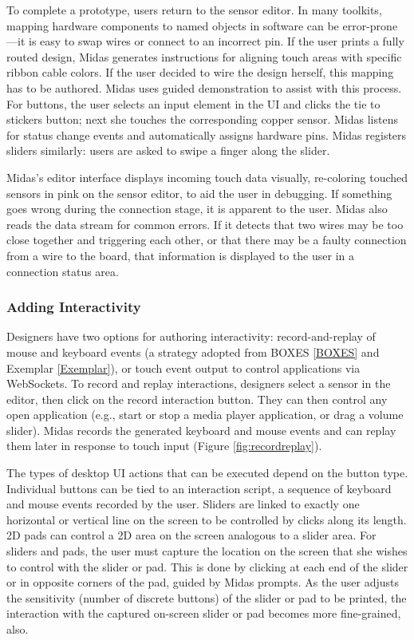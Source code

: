 To complete a prototype, users return to the sensor editor. In
many toolkits, mapping hardware components to named objects
in software can be error-prone—it is easy to swap wires
or connect to an incorrect pin. If the user prints a fully routed
design, Midas generates instructions for aligning touch areas
with specific ribbon cable colors. If the user decided to wire 
the design herself, this mapping has to be authored. Midas
uses guided demonstration to assist with this process. For
buttons, the user selects an input element in the UI and clicks
the tie to stickers button; next she touches the corresponding
copper sensor. Midas listens for status change events and
automatically assigns hardware pins. Midas registers sliders
similarly: users are asked to swipe a finger along the slider.

Midas’s editor interface displays incoming touch data visually,
re-coloring touched sensors in pink on the sensor editor,
to aid the user in debugging. If something goes wrong during
the connection stage, it is apparent to the user. Midas
also reads the data stream for common errors. If it detects
that two wires may be too close together and triggering each
other, or that there may be a faulty connection from a wire
to the board, that information is displayed to the user in a
connection status area.

\subsubsection{Adding Interactivity}
Designers have two options for authoring interactivity: record-and-replay
of mouse and keyboard events (a strategy adopted
from BOXES \ref{BOXES} and Exemplar \ref{Exemplar}), or touch event output
to control applications via WebSockets. To record and replay
interactions, designers select a sensor in the editor, then click
on the record interaction button. They can then control any
open application (e.g., start or stop a media player application,
or drag a volume slider). Midas records the generated
keyboard and mouse events and can replay them later in response
to touch input (Figure \ref{fig:recordreplay}).

The types of desktop UI actions that can be executed depend
on the button type. Individual buttons can be tied to an interaction
script, a sequence of keyboard and mouse events
recorded by the user. Sliders are linked to exactly one horizontal
or vertical line on the screen to be controlled by clicks
along its length. 2D pads can control a 2D area on the screen
analogous to a slider area. For sliders and pads, the user must
capture the location on the screen that she wishes to control
with the slider or pad. This is done by clicking at each end
of the slider or in opposite corners of the pad, guided by Midas
prompts. As the user adjusts the sensitivity (number of
discrete buttons) of the slider or pad to be printed, the interaction
with the captured on-screen slider or pad becomes
more fine-grained, also.

